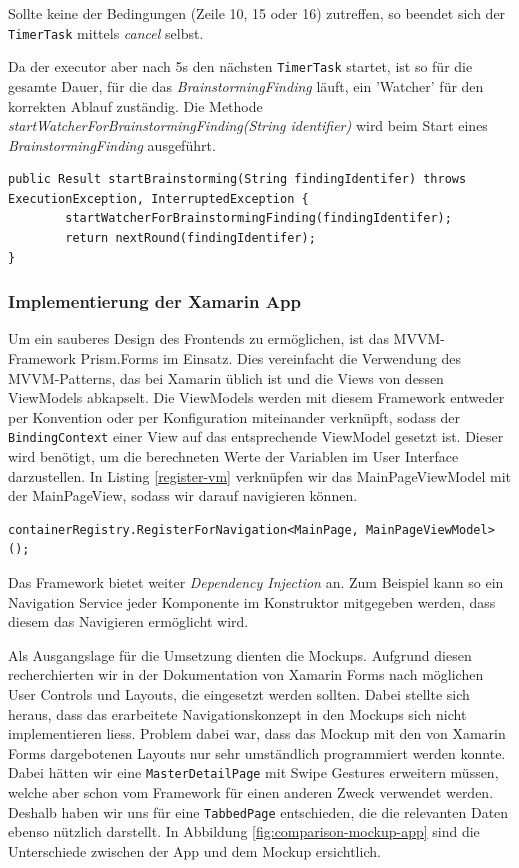 Sollte keine der Bedingungen (Zeile 10, 15 oder 16) zutreffen, so beendet sich der \texttt{TimerTask} mittels \textit{cancel} selbst. 

Da der executor aber nach 5s den nächsten \texttt{TimerTask} startet, ist so für die gesamte Dauer, für die das \textit{BrainstormingFinding} läuft, ein 'Watcher' für den korrekten Ablauf zuständig. Die Methode \textit{startWatcherForBrainstormingFinding(String identifier)} wird beim Start eines \textit{BrainstormingFinding} ausgeführt.

\begin{lstlisting}
public Result startBrainstorming(String findingIdentifer) throws ExecutionException, InterruptedException {
        startWatcherForBrainstormingFinding(findingIdentifer);
        return nextRound(findingIdentifer);
}
\end{lstlisting}

\subsubsection{Implementierung der Xamarin App}
Um ein sauberes Design des Frontends zu ermöglichen, ist das MVVM\--Framework Prism.Forms \cite{prism} im Einsatz. Dies vereinfacht die Verwendung des MVVM-Patterns, das bei Xamarin üblich ist und die Views von dessen ViewModels abkapselt. Die ViewModels werden mit diesem Framework entweder per Konvention oder per Konfiguration miteinander verknüpft, sodass der \texttt{BindingContext} einer View auf das entsprechende ViewModel gesetzt ist. Dieser wird benötigt, um die berechneten Werte der Variablen im User Interface darzustellen. In Listing \ref{register-vm} verknüpfen wir das MainPageViewModel mit der MainPageView, sodass wir darauf navigieren können. 

\begin{lstlisting}[label=register-vm,caption=Verknüpfung von View mit ViewModel in Prism.Forms]
containerRegistry.RegisterForNavigation<MainPage, MainPageViewModel>();
\end{lstlisting}

Das Framework bietet weiter \textit{Dependency Injection} an. Zum Beispiel kann so ein Navigation Service jeder Komponente im Konstruktor mitgegeben werden, dass diesem das Navigieren ermöglicht wird. 

Als Ausgangslage für die Umsetzung dienten die Mockups. Aufgrund diesen recherchierten wir in der Dokumentation von Xamarin Forms nach möglichen User Controls und Layouts, die eingesetzt werden sollten. Dabei stellte sich heraus, dass das erarbeitete Navigationskonzept in den Mockups sich nicht implementieren liess. Problem dabei war, dass das Mockup mit den von Xamarin Forms dargebotenen Layouts nur sehr umständlich programmiert werden konnte. Dabei hätten wir eine \texttt{MasterDetailPage} mit Swipe Gestures erweitern müssen, welche aber schon vom Framework für einen anderen Zweck verwendet werden. Deshalb haben wir uns für eine \texttt{TabbedPage} entschieden, die die relevanten Daten ebenso nützlich darstellt. In Abbildung \ref{fig:comparison-mockup-app} sind die Unterschiede zwischen  der App und dem Mockup ersichtlich.

